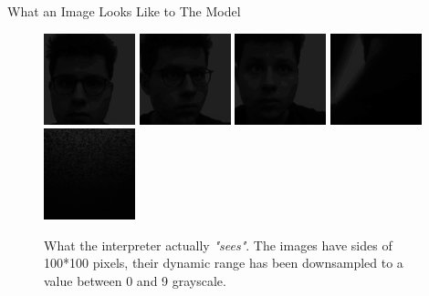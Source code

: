 \documentclass{beamer}
\begin{document}
\begin{frame}{What an Image Looks Like to The Model}
\begin{figure}
    \includegraphics[width = 1.8 cm]{images/inference/frame_0}\hfill
    \includegraphics[width = 1.8 cm]{images/inference/frame_1}\hfill
    \includegraphics[width = 1.8 cm]{images/inference/frame_3}\hfill
    \includegraphics[width = 1.8 cm]{images/inference/frame_4}\hfill
    \includegraphics[width = 1.8 cm]{images/inference/frame_5}\hfill
    \caption{What the interpreter actually \textit{"sees"}. The images have sides of 100*100 pixels, their dynamic range has been downsampled to a value between 0 and 9 grayscale.}
    \label{interpreter_eyes}
\end{figure}
\end{frame}
\end{document}
